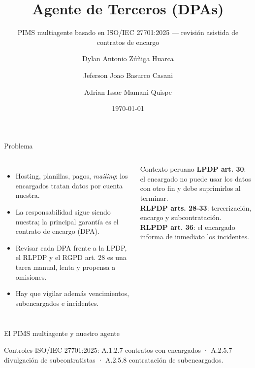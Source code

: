 \documentclass[aspectratio=169,10pt]{beamer}
\title{Agente de Terceros (DPAs)}
\subtitle{PIMS multiagente basado en ISO/IEC 27701:2025 --- revisión asistida de contratos de encargo}
\author{Dylan Antonio Zúñiga Huarca \and Jeferson Joao Basurco Casani \and Adrian Issac Mamani Quispe}
\institute{Auditoría de Sistemas · Escuela Profesional de Ingeniería de Sistemas · UNSA}
\date{\today}
\begin{document}
\maketitle

\begin{frame}{Problema}
\begin{columns}[T]
\begin{itemize}
  \item Hosting, planillas, pagos, \emph{mailing}: los \alert{encargados} tratan datos por cuenta nuestra.
  \item La responsabilidad \alert{sigue siendo nuestra}; la principal garantía es el \alert{contrato de encargo (DPA)}.
  \item Revisar cada DPA frente a la LPDP, el RLPDP y el RGPD art. 28 es una tarea \alert{manual, lenta y propensa a omisiones}.
  \item Hay que vigilar además vencimientos, subencargados e incidentes.
\end{itemize}
\begin{block}{Contexto peruano}
\small \textbf{LPDP art. 30}: el encargado no puede usar los datos con otro fin y debe suprimirlos al terminar.\\[2pt]
\textbf{RLPDP arts. 28-33}: tercerización, encargo y subcontratación.\\[2pt]
\textbf{RLPDP art. 36}: el encargado informa de inmediato los incidentes.
\end{block}
\end{columns}
\end{frame}

\begin{frame}{El PIMS multiagente y nuestro agente}
\begin{center}
\end{center}
\small Controles ISO/IEC 27701:2025: \alert{A.1.2.7} contratos con encargados · \alert{A.2.5.7} divulgación de subcontratistas · \alert{A.2.5.8} contratación de subencargados.
\end{frame}
\end{document}
